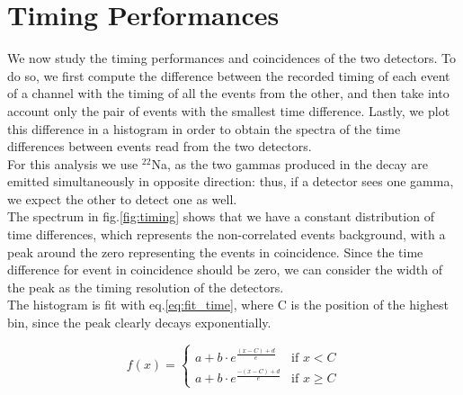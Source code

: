 \section{Timing Performances}
\label{sec:timing}

We now study the timing performances and coincidences of the two detectors. To do so, we first compute the difference between the recorded timing of each event of a channel with the timing of all the events from the other, and then take into account only the pair of events with the smallest time difference. Lastly, we plot this difference in a histogram in order to obtain the spectra of the time differences between events read from the two detectors. \\
For this analysis we use $^{22}$Na, as the two gammas produced in the decay are emitted simultaneously in opposite direction: thus, if a detector sees one gamma, we expect the other to detect one as well. \\

The spectrum in fig.\ref{fig:timing} shows that we have a constant distribution of time differences, which represents the non-correlated events background, with a peak around the zero representing the events in coincidence. Since the time difference for event in coincidence should be zero, we can consider the width of the peak as the timing resolution of the detectors. \\
The histogram is fit with eq.\ref{eq:fit_time}, where C is the position of the highest bin, since the peak clearly decays exponentially. 

\begin{equation}\label{eq:fit_time}
    f(x)= 
\begin{cases}
    a+b \cdot e^{\frac{(x-C)+d}{e}}& \text{if } x<C\\
    a+b \cdot e^{\frac{-(x-C)+d}{e}}              & \text{if } x \geq C
\end{cases}
\end{equation} 

